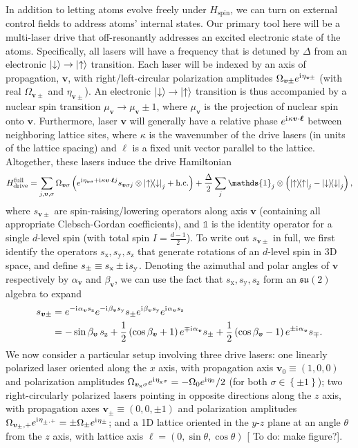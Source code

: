 \documentclass[nofootinbib,notitlepage,11pt]{revtex4-2}
\renewcommand{\t}{\text} %
\newcommand{\f}[2]{\dfrac{#1}{#2}} %
\newcommand{\p}[1]{\left(#1\right)} %
\renewcommand{\set}[1]{\left\{#1\right\}} %
\renewcommand{\v}{\bm} %
\renewcommand{\c}{\cdot} %
\renewcommand{\i}{\mathrm{i}\mkern1mu} %
\newcommand{\1}{\mathds{1}}
\newcommand{\up}{\uparrow}
\newcommand{\dn}{\downarrow}
\newcommand{\x}{\text{x}}
\newcommand{\y}{\text{y}}
\newcommand{\z}{\text{z}}
\newcommand{\su}{\mathfrak{su}}
\newcommand{\todo}[1]{{\color{magenta} To do: #1}}
\begin{document}
In addition to letting atoms evolve freely under $H_{\t{spin}}$, we can turn on external control fields to address atoms' internal states.
Our primary tool here will be a multi-laser drive that off-resonantly addresses an excited electronic state of the atoms.
Specifically, all lasers will have a frequency that is detuned by $\Delta$ from an electronic $\ket\dn\to\ket\up$ transition.
Each laser will be indexed by an axis of propagation, $\v v$, with right/left-circular polarization amplitudes $\Omega_{\v v\pm} e^{\i\eta_{\v v\pm}}$ (with real $\Omega_{\v v\pm}$ and $\eta_{\v v\pm}$).
An electronic $\ket\dn\to\ket\up$ transition is thus accompanied by a nuclear spin transition $\mu_{\v v}\to\mu_{\v v}\pm1$, where $\mu_{\v v}$ is the projection of nuclear spin onto $\v v$.
Furthermore, laser $\v v$ will generally have a relative phase $e^{\i\kappa\v v\c\v\ell}$ between neighboring lattice sites, where $\kappa$ is the wavenumber of the drive lasers (in units of the lattice spacing) and $\v\ell$ is a fixed unit vector parallel to the lattice.
Altogether, these lasers induce the drive Hamiltonian
\begin{align}
  H_{\t{drive}}^{\t{full}} = \sum_{j,\v v,\sigma}
  \Omega_{\v v\sigma} \p{e^{\i\eta_{\v v\sigma} + \i\kappa\v v\c\v\ell j}
    s_{\v v\sigma j} \otimes \op{\up}{\dn}_j + \t{h.c.}}
  + \f{\Delta}{2} \sum_j \1_j \otimes\p{\op\up_j-\op\dn_j},
\end{align}
where $s_{\v v\pm}$ are spin-raising/lowering operators along axis $\v v$ (containing all appropriate Clebsch-Gordan coefficients), and $\1$ is the identity operator for a single $d$-level spin (with total spin $I=\frac{d-1}{2}$).
To write out $s_{\v v\pm}$ in full, we first identify the operators $s_\x,s_\y,s_\z$ that generate rotations of an $d$-level spin in 3D space, and define $s_\pm\equiv s_\x\pm\i s_\y$.
Denoting the azimuthal and polar angles of $\v v$ respectively by $\alpha_{\v v}$ and $\beta_{\v v}$, we can use the fact that $s_\x,s_\y,s_\z$ form an $\su(2)$ algebra to expand
\begin{align}
  s_{\v v\pm}
  &= e^{-\i\alpha_{\v v}s_\z} e^{-\i\beta_{\v v}s_\y}
  s_\pm e^{\i\beta_{\v v}s_\y} e^{\i\alpha_{\v v}s_\z} \\
  &= -\sin\beta_{\v v}\, s_\z
  + \f12 \p{\cos\beta_{\v v}+1} e^{\mp\i\alpha_{\v v}} s_\pm
  + \f12 \p{\cos\beta_{\v v}-1} e^{\pm\i\alpha_{\v v}} s_\mp.
\end{align}
We now consider a particular setup involving three drive lasers: one linearly polarized laser oriented along the $x$ axis, with propagation axis $\v v_0\equiv\p{1,0,0}$ and polarization amplitudes $\Omega_{\v v_\x\sigma}e^{\i\eta_{\v_\x\sigma}}=-\Omega_0e^{\i\eta_0}/2$ (for both $\sigma\in\set{\pm1}$); two right-circularly polarized lasers pointing in opposite directions along the $z$ axis, with propagation axes $\v v_\pm\equiv\p{0,0,\pm1}$ and polarization amplitudes $\Omega_{\v v_\pm,+}e^{\i\eta_{\v_\pm,+}}=\pm\Omega_\pm e^{\i\eta_\pm}$; and a 1D lattice oriented in the $y$-$z$ plane at an angle $\theta$ from the $z$ axis, with lattice axis $\v\ell=\p{0,\sin\theta,\cos\theta}$ [\todo{make figure?}].
\end{document}
